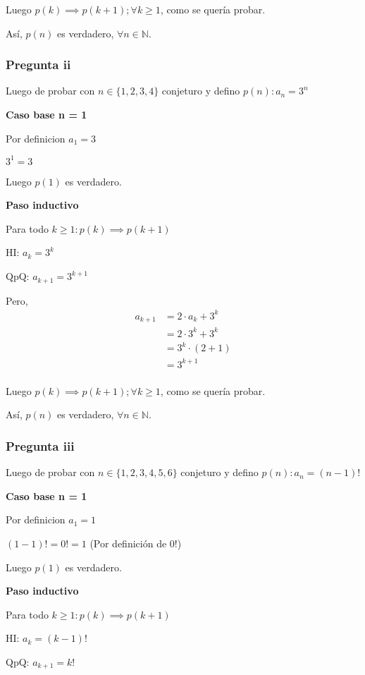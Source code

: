 Luego $p(k) \implies p(k+1); \forall k \geq 1$, como se quería probar.

Así, $p(n)$ es verdadero, $\forall n \in \mathbb{N}$.

\subsubsection{Pregunta ii}

Luego de probar con $ n \in \{ 1,2,3,4 \} $ conjeturo y defino $ p(n): a_n = 3^n $

\textbf{Caso base n = 1}

Por definicion $ a_1 = 3$

$ 3^1 = 3$

Luego $ p(1) $ es verdadero.

\textbf{Paso inductivo}

Para todo $k \geq 1: p(k) \implies p(k+1)$

HI: $ a_k = 3^k$

QpQ: $ a_{k+1} = 3^{k+1}$

Pero,
\begin{align*}
    a_{k+1} &= 2\cdot a_k + 3^k \\
    &= 2\cdot 3^k + 3^k \\
    &= 3^k\cdot (2+1) \\
    &= 3^{k+1} \\
\end{align*}

Luego $p(k) \implies p(k+1); \forall k \geq 1$, como se quería probar.

Así, $p(n)$ es verdadero, $\forall n \in \mathbb{N}$.

\subsubsection{Pregunta iii}

Luego de probar con $ n \in \{ 1,2,3,4,5,6 \} $ conjeturo y defino $ p(n): a_n = (n-1)! $

\textbf{Caso base n = 1}

Por definicion $ a_1 = 1$

$ (1-1)! = 0! = 1$ (Por definición de 0!)

Luego $ p(1) $ es verdadero.

\textbf{Paso inductivo}

Para todo $k \geq 1: p(k) \implies p(k+1)$

HI: $ a_k = (k-1)!$

QpQ: $ a_{k+1} = k!$

